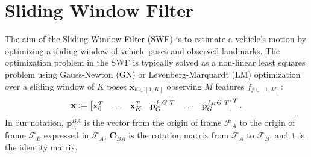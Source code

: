\documentclass[letterpaper, 10 pt, conference]{ieeeconf}  %
\def\Vec#1{\mathbf{#1}}
\newcommand{\bbm}{\begin{bmatrix}}
\newcommand{\ebm}{\end{bmatrix}}
\begin{document}

\section{Sliding Window Filter} \label{sec:SWF}
The aim of the Sliding Window Filter (SWF) is to estimate a vehicle's motion by optimizing a sliding window of vehicle poses and observed landmarks.
The optimization problem in the SWF is typically solved as a non-linear least squares problem using Gauss-Newton (GN) or Levenberg-Marquardt (LM) optimization over a sliding window of $K$ poses $\Vec x_{k\in[1,K]}$ observing $M$ features $f_{j\in[1,M]}$: 
\begin{equation}
\Vec{x} := \bbm \Vec x_0^T & \hdots & \Vec x_K^T & {\Vec {p}_G^{f_1G \hspace{0.3em} T}} & \hdots & {\Vec {p}_G^{f_MG \hspace{0.3em} T}} \ebm ^T.
\end{equation}
In our notation, $\Vec p^{BA}_A$ is the vector from the origin of frame $\mathcal{F}_A$ to the origin of frame $\mathcal{F}_B$ expressed in $\mathcal{F}_A$, $\Vec C_{BA}$ is the rotation matrix from $\mathcal{F}_A$ to $\mathcal{F}_B$, and $\Vec{1}$ is the identity matrix.
\end{document}
